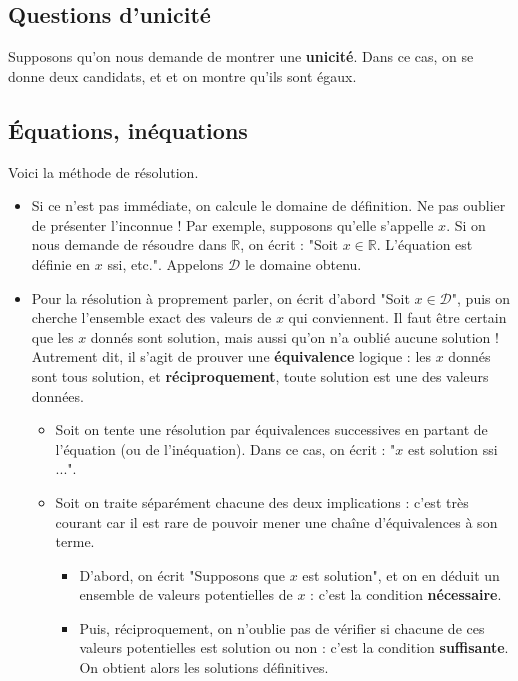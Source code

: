 \documentclass[french]{book}
\newcommand{\R}{\mathbb{R}}
\theoremstyle{plain}
\theoremstyle{definition}
\theoremstyle{remark}
\begin{document}
\subsection{Questions d'unicité}
Supposons qu'on nous demande de montrer une \textbf{unicité}. Dans ce cas, on se donne deux candidats, et et on montre qu'ils sont égaux.
\subsection{Équations, inéquations}
Voici la méthode de résolution.
\begin{itemize}
	\item Si ce n'est pas immédiate, on calcule le domaine de définition. Ne pas oublier de présenter l'inconnue ! Par exemple, supposons qu'elle s'appelle $x$. Si on nous demande de résoudre dans $\R$, on écrit : "Soit $x\in\R$. L'équation est définie en $x$ ssi, etc.". Appelons $\mathcal{D}$ le domaine obtenu.
	\item Pour la résolution à proprement parler, on écrit d'abord "Soit $x\in\mathcal{D}$", puis on cherche l'ensemble exact des valeurs de $x$ qui conviennent. Il faut être certain que les $x$ donnés sont solution, mais aussi qu'on n'a oublié aucune solution ! Autrement dit, il s'agit de prouver une \textbf{équivalence} logique : les $x$ donnés sont tous solution, et \textbf{réciproquement}, toute solution est une des valeurs données.
	\begin{itemize}
		\item[--] Soit on tente une résolution par équivalences successives en partant de l'équation (ou de l'inéquation). Dans ce cas, on écrit : "$x$ est solution ssi ...".
		\item[--] Soit on traite séparément chacune des deux implications : c'est très courant car il est rare de pouvoir mener une chaîne d'équivalences à son terme.
		\begin{itemize}
			\item[*] D'abord, on écrit "Supposons que $x$ est solution", et on en déduit un ensemble de valeurs potentielles de $x$ : c'est la condition \textbf{nécessaire}.
			\item[*] Puis, réciproquement, on n'oublie pas de vérifier si chacune de ces valeurs potentielles est solution ou non : c'est la condition \textbf{suffisante}. On obtient alors les solutions définitives.
		\end{itemize}
	\end{itemize}
\end{itemize}
\end{document}
